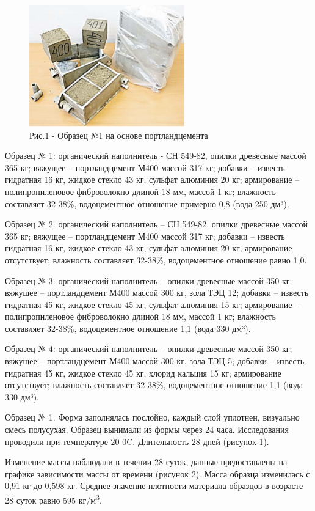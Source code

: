 \begin{figure}[H]
	\centering
	\includegraphics[width=0.6\textwidth]{media/chem/image2}
	\caption*{Рис.1 - Образец №1 на основе портландцемента}
\end{figure}

\begin{multicols}{2}
Образец № 1: органический наполнитель - СН 549-82, опилки древесные
массой 365 кг; вяжущее -- портландцемент М400 массой 317 кг; добавки --
известь гидратная 16 кг, жидкое стекло 43 кг, сульфат алюминия 20 кг;
армирование -- полипропиленовое фиброволокно длиной 18 мм, массой 1 кг;
влажность составляет 32-38\%, водоцементное отношение примерно 0,8 (вода
250 дм³).

Образец № 2: органический наполнитель -- СН 549-82, опилки древесные
массой 365 кг; вяжущее -- портландцемент М400 массой 317 кг; добавки --
известь гидратная 16 кг, жидкое стекло 43 кг, сульфат алюминия 20 кг;
армирование отсутствует; влажность составляет 32-38\%, водоцементное
отношение равно 1,0.

Образец № 3: органический наполнитель -- опилки древесные массой 350 кг;
вяжущее -- портландцемент М400 массой 300 кг, зола ТЭЦ 12; добавки --
известь гидратная 45 кг, жидкое стекло 45 кг, сульфат алюминия 15 кг;
армирование -- полипропиленовое фиброволокно длиной 18 мм, массой 1 кг;
влажность составляет 32-38\%, водоцементное отношение 1,1 (вода 330
дм³).

Образец № 4: органический наполнитель -- опилки древесные массой 350 кг;
вяжущее -- портландцемент М400 массой 300 кг, зола ТЭЦ 5; добавки --
известь гидратная 45 кг, жидкое стекло 45 кг, хлорид кальция 15 кг;
армирование отсутствует; влажность составляет 32-38\%, водоцементное
отношение 1,1 (вода 330 дм³).

Образец № 1. Форма заполнялась послойно, каждый слой уплотнен, визуально
смесь полусухая. Образец вынимали из формы через 24 часа. Исследования
проводили при температуре 20 0C. Длительность 28 дней (рисунок 1).

Изменение массы наблюдали в течении 28 суток, данные предоставлены на
графике зависимости массы от времени (рисунок 2). Масса образца
изменилась с 0,91 кг до 0,598 кг. Среднее значение плотности материала
образцов в возрасте 28 суток равно 595 кг/м\textsuperscript{3}.
\end{multicols}

